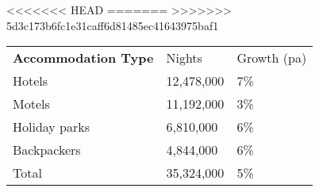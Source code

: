 <<<<<<< HEAD
=======
>>>>>>> 5d3c173b6fc1e31caff6d81485ec41643975baf1
\begin{tabular}[t]{p{4.5cm}>{\hfill}p{1.3cm}>{\hfill}p{1.7cm}}
 \textbf{Accommodation Type} & Nights & Growth (pa) \\ 
 Hotels & 12,478,000 & 7\% \\ 
  Motels & 11,192,000 & 3\% \\ 
  Holiday parks &  6,810,000 & 6\% \\ 
  Backpackers &  4,844,000 & 6\% \\ 
  Total & 35,324,000 & 5\% \\ 
  \end{tabular}
